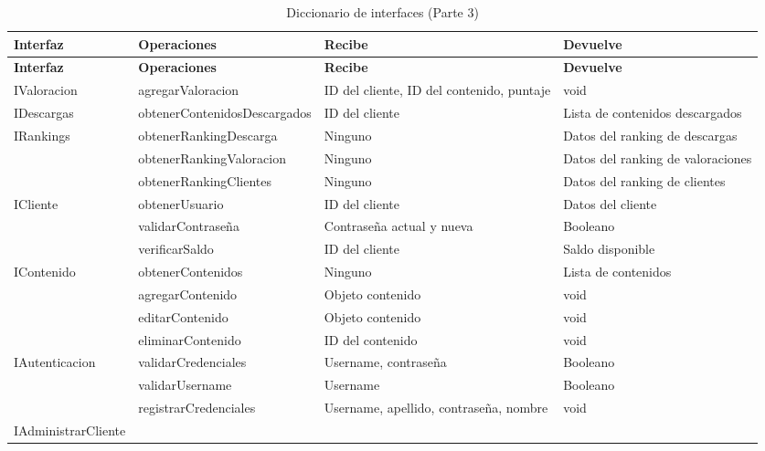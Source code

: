 \begin{longtable}{|p{5cm}|p{4cm}|p{3.5cm}|p{3.5cm}|}
\caption{Diccionario de interfaces (Parte 3)}
\label{tab:diccionario_interfaces_3} \\

\hline
\textbf{Interfaz} & \textbf{Operaciones} & \textbf{Recibe} & \textbf{Devuelve} \\ \hline
\endfirsthead

\hline
\textbf{Interfaz} & \textbf{Operaciones} & \textbf{Recibe} & \textbf{Devuelve} \\ \hline
\endhead

\multirow{1}{5cm}{IValoracion} 
    & agregarValoracion & ID del cliente, ID del contenido, puntaje & void \\ \hline
\multirow{1}{5cm}{IDescargas} 
    & obtenerContenidosDescargados & ID del cliente & Lista de contenidos descargados \\ \hline
\multirow{3}{5cm}{IRankings} 
    & obtenerRankingDescarga & Ninguno & Datos del ranking de descargas \\ \cline{2-4}
    & obtenerRankingValoracion & Ninguno & Datos del ranking de valoraciones \\ \cline{2-4}
    & obtenerRankingClientes & Ninguno & Datos del ranking de clientes \\ \hline
\multirow{3}{5cm}{ICliente} 
    & obtenerUsuario & ID del cliente & Datos del cliente \\ \cline{2-4}
    & validarContraseña & Contraseña actual y nueva & Booleano \\ \cline{2-4}
    & verificarSaldo & ID del cliente & Saldo disponible \\ \hline
\multirow{4}{5cm}{IContenido} 
    & obtenerContenidos & Ninguno & Lista de contenidos \\ \cline{2-4}
    & agregarContenido & Objeto contenido & void \\ \cline{2-4}
    & editarContenido & Objeto contenido & void \\ \cline{2-4}
    & eliminarContenido & ID del contenido & void \\ \hline
\multirow{3}{5cm}{IAutenticacion} 
    & validarCredenciales & Username, contraseña & Booleano \\ \cline{2-4}
    & validarUsername & Username & Booleano \\ \cline{2-4}
    & registrarCredenciales & Username, apellido, contraseña, nombre & void \\ \hline
\multirow{2}{5cm}{IAdministrarCliente} 

\end{longtable}
